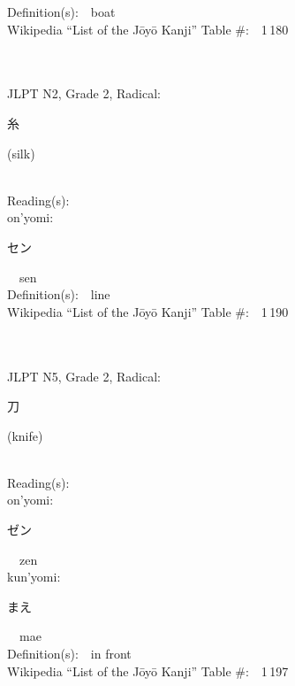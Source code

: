 \begin{multicols}{2}
Definition(s):\ \ boat \\
Wikipedia ``List of the J\=oy\=o Kanji'' Table \#:\ \ 1\,180 \\
\ \ \\
{\fontsize{34pt}{40pt}  }\ \ \\  %
{JLPT N2, Grade 2, Radical:\ \ {\begin{CJK}{UTF8}{min} 糸 \end{CJK}} (silk) } \\
Reading(s):\ \ \\
{\hspace*{1em}}on'yomi:\ \ \\
{\hspace*{2em}}{\begin{CJK}{UTF8}{min} セン \end{CJK}}\ \ sen\ \ \\
Definition(s):\ \ line \\
Wikipedia ``List of the J\=oy\=o Kanji'' Table \#:\ \ 1\,190 \\
\ \ \\
{\fontsize{34pt}{40pt}  }\ \ \\  %
{JLPT N5, Grade 2, Radical:\ \ {\begin{CJK}{UTF8}{min} 刀 \end{CJK}} (knife) } \\
Reading(s):\ \ \\
{\hspace*{1em}}on'yomi:\ \ \\
{\hspace*{2em}}{\begin{CJK}{UTF8}{min} ゼン \end{CJK}}\ \ zen\ \ \\
{\hspace*{1em}}kun'yomi:\ \ \\
{\hspace*{2em}}{\begin{CJK}{UTF8}{min} まえ \end{CJK}}\ \ mae\ \ \\
Definition(s):\ \ in front \\
Wikipedia ``List of the J\=oy\=o Kanji'' Table \#:\ \ 1\,197 \\

\end{multicols}
